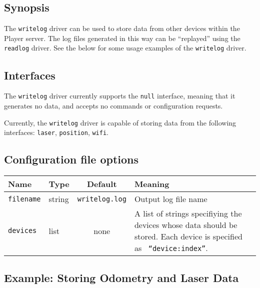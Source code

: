 
\subsection*{Synopsis}

The {\tt writelog} driver can be used to store data from other devices
within the Player server.  The log files generated in this way can be
``replayed'' using the {\tt readlog} driver.  See the below for some
usage examples of the {\tt writelog} driver.



\subsection*{Interfaces}

The {\tt writelog} driver currently supports the {\tt null} interface,
meaning that it generates no data, and accepts no commands or
configuration requests.

Currently, the {\tt writelog} driver is capable of storing data from
the following interfaces: {\tt laser}, {\tt position}, {\tt wifi}.


\subsection*{Configuration file options}

\begin{center}
{\small \begin{tabularx}{\columnwidth}{|l|l|c|X|}
\hline
Name & Type & Default & Meaning\\
\hline
{\tt filename} & string & {\tt writelog.log} & Output log file name \\
{\tt devices} & list & none & A list of strings specifiying the
devices whose data should be stored.  Each device is specified as {\tt
``device:index''}. \\
\hline
\end{tabularx}}
\end{center}




\subsection*{Example: Storing Odometry and Laser Data}

